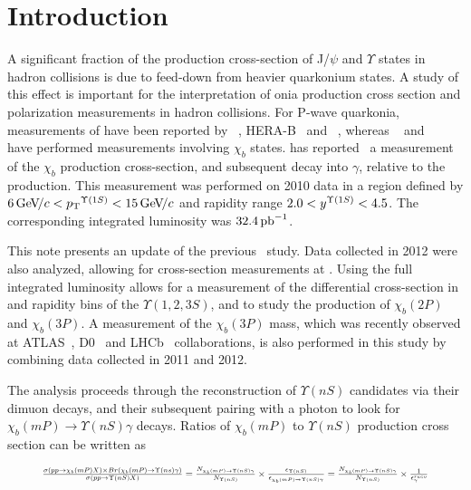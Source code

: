 \section{Introduction}
\label{sec:introduction}

A significant fraction of the production cross-section of J/$\psi$ and
$\Upsilon$ states in hadron collisions is due to feed-down from heavier
quarkonium states. A study of this effect is important for the interpretation of
onia production cross section and polarization measurements in hadron
collisions. For P-wave quarkonia, measurements of \chic have been reported by
\cdf~\cite{Abulencia:2007bra}, HERA-B~\cite{Abt:2008ed}
and \lhcb~\cite{LHCb-PAPER-2011-019}, whereas \cdf~\cite{Affolder:1999wm} and 
\atlas~\cite{Aad:2011ih} have performed measurements involving $\chi_b$ states.
\lhcb has reported~\cite{LHCb-PAPER-2012-015} a measurement of
the $\chi_b$ production cross-section, and subsequent decay into \OneS $\gamma$,
relative to the \OneS production. This measurement was performed on 2010 data
in a region defined by $6 \gevc < \pt^{\Y1S} < 15 \gevc$ and rapidity range
$2.0 < y^{\Y1S} < 4.5$.
The corresponding integrated luminosity was $32.4\mbox{\,pb}^{-1}$.

This note presents an update of the previous \lhcb\ study. Data collected in
2012 were also analyzed, allowing for cross-section measurements at \tev.
Using the full integrated luminosity allows for a measurement of the
differential cross-section in \pt and rapidity bins of the $\Upsilon(1,2,3S)$,
and to study the production of $\chi_b(2P)$ and $\chi_b(3P)$. A measurement of
the $\chi_b(3P)$ mass, which was recently observed at ATLAS~\cite{Aad:2011ih},
D0~\cite{Abazov:2012gh} and LHCb~\cite{LHCb-CONF-2012-020} collaborations, is
also performed in this study by combining data collected in 2011 and 2012.

The analysis proceeds through the reconstruction of $\Upsilon(nS)$ candidates
via their dimuon decays, and their subsequent pairing with a photon to look for
$\chi_b(mP) \to \Upsilon(nS) \gamma$ decays. Ratios of $\chi_b(mP)$ to
$\Upsilon(nS)$ production cross section can be written as

\begin{equation}
\resizebox{.9\hsize}{!}{
$
\frac{\sigma(pp \to \chi_b (mP) X) \times Br (\chi_b (mP) \to \Upsilon(ns) \gamma)}{\sigma(pp \to \Upsilon(nS) X)} =
\frac{N_{\chi_b (mP)\to \Upsilon(nS) \gamma}}{N_{\Upsilon(nS)}} \times \frac{\epsilon_{\Upsilon(nS)}}{\epsilon_{\chi_b (mP)\to \Upsilon(nS) \gamma}} =
\frac{N_{\chi_b (mP)\to \Upsilon(nS) \gamma}}{N_{\Upsilon(nS)}} \times \frac{1}{\epsilon^{reco}_{\gamma}}
$
}
\label{eqn:master}
\end{equation}


